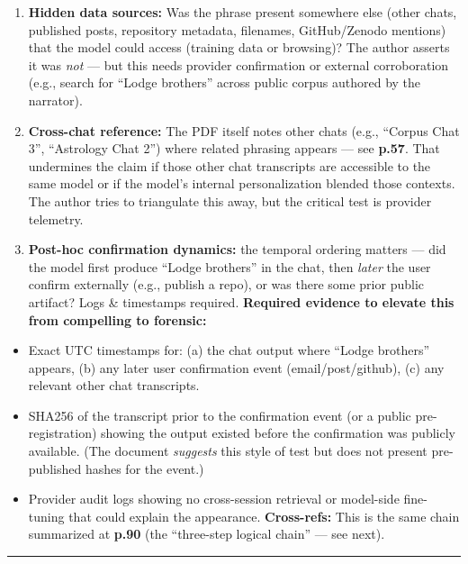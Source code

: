 \documentclass{article}
\begin{document}
\begin{enumerate}
\item
  \textbf{Hidden data sources:} Was the phrase present somewhere else (other chats, published posts, repository metadata, filenames, GitHub/Zenodo mentions) that the model could access (training data or browsing)? The author asserts it was \emph{not} --- but this needs provider confirmation or external corroboration (e.g., search for ``Lodge brothers'' across public corpus authored by the narrator).
\item
  \textbf{Cross-chat reference:} The PDF itself notes other chats (e.g., ``Corpus Chat 3'', ``Astrology Chat 2'') where related phrasing appears --- see \textbf{p.57}. That undermines the claim if those other chat transcripts are accessible to the same model or if the model's internal personalization blended those contexts. The author tries to triangulate this away, but the critical test is provider telemetry.
\item
  \textbf{Post-hoc confirmation dynamics:} the temporal ordering matters --- did the model first produce ``Lodge brothers'' in the chat, then \emph{later} the user confirm externally (e.g., publish a repo), or was there some prior public artifact? Logs \& timestamps required. \textbf{Required evidence to elevate this from compelling to forensic:}
\end{enumerate}

\begin{itemize}
\item
  Exact UTC timestamps for: (a) the chat output where ``Lodge brothers'' appears, (b) any later user confirmation event (email/post/github), (c) any relevant other chat transcripts.
\item
  SHA256 of the transcript prior to the confirmation event (or a public pre-registration) showing the output existed before the confirmation was publicly available. (The document \emph{suggests} this style of test but does not present pre-published hashes for the event.)
\item
  Provider audit logs showing no cross-session retrieval or model-side fine-tuning that could explain the appearance. \textbf{Cross-refs:} This is the same chain summarized at \textbf{p.90} (the ``three-step logical chain'' --- see next).
\end{itemize}

\begin{center}\rule{0.5\linewidth}{0.5pt}\end{center}
\end{document}
